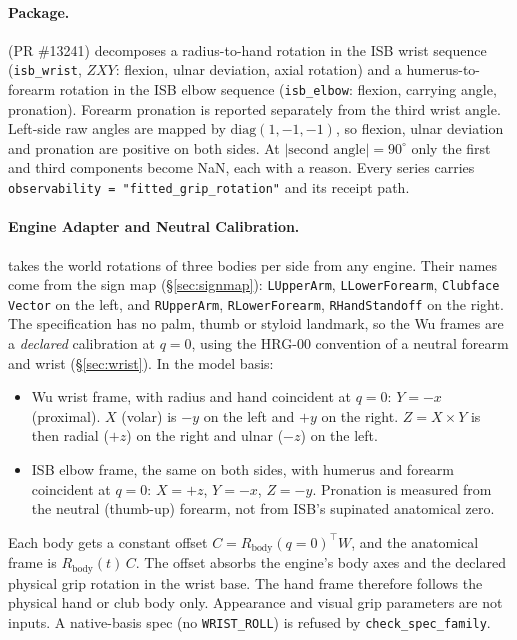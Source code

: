 \documentclass[11pt,a4paper]{article}
\begin{document}
\paragraph{Package.}
 (PR \#13241) decomposes a
radius-to-hand rotation in the ISB wrist sequence (\texttt{isb\_wrist},
$ZXY$: flexion, ulnar deviation, axial rotation) and a humerus-to-forearm
rotation in the ISB elbow sequence (\texttt{isb\_elbow}: flexion, carrying
angle, pronation).  Forearm pronation is reported separately from the third
wrist angle.  Left-side raw angles are mapped by
$\mathrm{diag}(1,-1,-1)$, so flexion, ulnar deviation and pronation are
positive on both sides.  At $|\text{second angle}|=90^{\circ}$ only the first
and third components become NaN, each with a reason.  Every series carries
\texttt{observability = "fitted\_grip\_rotation"} and its receipt path.

\paragraph{Engine Adapter and Neutral Calibration.}
 takes the world rotations of three
bodies per side from any engine.  Their names come from the sign map
(\S\ref{sec:signmap}): \texttt{LUpperArm}, \texttt{LLowerForearm},
\texttt{Clubface Vector} on the left, and \texttt{RUpperArm},
\texttt{RLowerForearm}, \texttt{RHandStandoff} on the right.  The
specification has no palm, thumb or styloid landmark, so the Wu frames are a
\emph{declared} calibration at $q=0$, using the HRG-00 convention of a
neutral forearm and wrist (\S\ref{sec:wrist}).  In the model basis:
\begin{itemize}[nosep]
  \item Wu wrist frame, with radius and hand coincident at $q=0$:
    $Y=-x$ (proximal).  $X$ (volar) is $-y$ on the left and $+y$ on the
    right.  $Z=X\times Y$ is then radial ($+z$) on the right and ulnar
    ($-z$) on the left.
  \item ISB elbow frame, the same on both sides, with humerus and forearm
    coincident at $q=0$: $X=+z$, $Y=-x$, $Z=-y$.  Pronation is measured from
    the neutral (thumb-up) forearm, not from ISB's supinated anatomical zero.
\end{itemize}
Each body gets a constant offset $C=R_{\mathrm{body}}(q{=}0)^{\top}W$, and
the anatomical frame is $R_{\mathrm{body}}(t)\,C$.  The offset absorbs the
engine's body axes and the declared physical grip rotation in the wrist base.
The hand frame therefore follows the physical hand or club body only.
Appearance and visual grip parameters are not inputs.  A native-basis spec
(no \texttt{WRIST\_ROLL}) is refused by \texttt{check\_spec\_family}.
\end{document}
